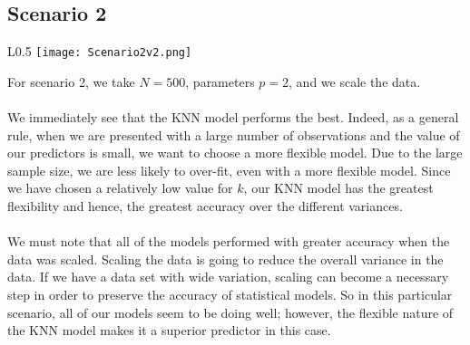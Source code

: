 \documentclass[11pt, oneside]{article}
\begin{document}
\subsection{Scenario 2}
\begin{wrapfigure}[]{L}{0.5\textwidth}
\vspace{-0.55cm}
\texttt{[image: Scenario2v2.png]}
\vspace{-.25cm}
\end{wrapfigure}
For scenario 2, we take $N=500$, parameters $p=2$, and we scale the data.\\
\\
We immediately see that the KNN model performs the best. Indeed, as a general rule, when we are presented with a large number of observations and the value of our predictors is small, we want to choose a more flexible model. Due to the large sample size, we are less likely to over-fit, even with a more flexible model. Since we have chosen a relatively low value for $k$, our KNN model has the greatest flexibility and hence, the greatest accuracy over the different variances.\\
\\
We must note that all of the models performed with greater accuracy when the data was scaled. Scaling the data is going to reduce the overall variance in the data. If we have a data set with wide variation, scaling can become a necessary step in order to preserve the accuracy of statistical models. So in this particular scenario, all of our models seem to be doing well; however, the flexible nature of the KNN model makes it a superior predictor in this case.




\end{document}
